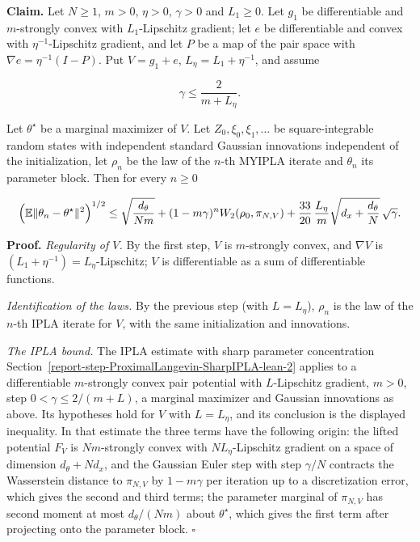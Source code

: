 \documentclass[11pt,a4paper]{report}
\begin{document}
\textbf{Claim.} Let \(N\ge1\), \(m>0\), \(\eta>0\), \(\gamma>0\) and \(L_1\ge0\). Let \(g_1\) be differentiable and \(m\)-strongly convex with \(L_1\)-Lipschitz gradient; let \(e\) be differentiable and convex with \(\eta^{-1}\)-Lipschitz gradient, and let \(P\) be a map of the pair space with \(\nabla e=\eta^{-1}(I-P)\). Put \(V=g_1+e\), \(L_\eta=L_1+\eta^{-1}\), and assume


\[\gamma\le\frac{2}{m+L_\eta}.\]


Let \(\theta^\star\) be a marginal maximizer of \(V\). Let \(Z_0,\xi_0,\xi_1,\dots\) be square-integrable random states with independent standard Gaussian innovations independent of the initialization, let \(\rho_n\) be the law of the \(n\)-th MYIPLA iterate and \(\theta_n\) its parameter block. Then for every \(n\ge0\)


\[\Bigl(\mathbb E\|\theta_n-\theta^\star\|^2\Bigr)^{1/2}\le\sqrt{\frac{d_\theta}{Nm}}+(1-m\gamma)^nW_2(\rho_0,\pi_{N,V})+\frac{33}{20}\,\frac{L_\eta}{m}\sqrt{d_x+\frac{d_\theta}{N}}\,\sqrt\gamma .\]


\textbf{Proof.} \emph{Regularity of \(V\).} By the first step, \(V\) is \(m\)-strongly convex, and \(\nabla V\) is \((L_1+\eta^{-1})=L_\eta\)-Lipschitz; \(V\) is differentiable as a sum of differentiable functions.




\emph{Identification of the laws.} By the previous step (with \(L=L_\eta\)), \(\rho_n\) is the law of the \(n\)-th IPLA iterate for \(V\), with the same initialization and innovations.




\emph{The IPLA bound.} The IPLA estimate with sharp parameter concentration Section~\ref{report-step-ProximalLangevin-SharpIPLA-lean-2} applies to a differentiable \(m\)-strongly convex pair potential with \(L\)-Lipschitz gradient, \(m>0\), step \(0<\gamma\le2/(m+L)\), a marginal maximizer and Gaussian innovations as above. Its hypotheses hold for \(V\) with \(L=L_\eta\), and its conclusion is the displayed inequality. In that estimate the three terms have the following origin: the lifted potential \(F_V\) is \(Nm\)-strongly convex with \(NL_\eta\)-Lipschitz gradient on a space of dimension \(d_\theta+Nd_x\), and the Gaussian Euler step with step \(\gamma/N\) contracts the Wasserstein distance to \(\pi_{N,V}\) by \(1-m\gamma\) per iteration up to a discretization error, which gives the second and third terms; the parameter marginal of \(\pi_{N,V}\) has second moment at most \(d_\theta/(Nm)\) about \(\theta^\star\), which gives the first term after projecting onto the parameter block. \(\square\)
\end{document}

